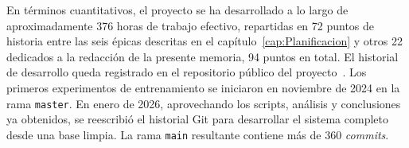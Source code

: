 \enlargethispage{\baselineskip}
En términos cuantitativos, el proyecto se ha desarrollado a lo largo de aproximadamente 376 horas de trabajo efectivo, repartidas en 72 puntos de historia entre las seis épicas descritas en el capítulo~\ref{cap:Planificacion} y otros 22 dedicados a la redacción de la presente memoria, 94 puntos en total. El historial de desarrollo queda registrado en el repositorio público del proyecto~\cite{cie10repo2026}. Los primeros experimentos de entrenamiento se iniciaron en noviembre de 2024 en la rama \texttt{master}. En enero de 2026, aprovechando los scripts, análisis y conclusiones ya obtenidos, se reescribió el historial Git para desarrollar el sistema completo desde una base limpia. La rama \texttt{main} resultante contiene más de 360 \emph{commits}.
